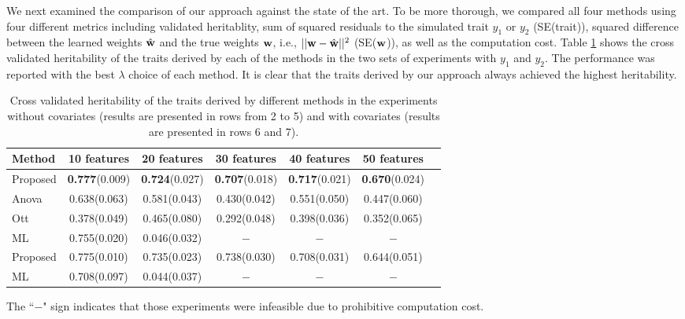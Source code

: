 \documentclass[10pt,letterpaper]{article}
\newcommand{\vect}[1]{\ensuremath\boldsymbol{\rm #1}}
\begin{document}
We next examined the comparison of our approach against the state of the art. To be more thorough, we compared all four methods using four different metrics including validated heritablity, sum of squared residuals to the simulated trait $y_1$ or $y_2$ (SE(trait)), squared difference between the learned weights $\hat{\vect w}$ and the true weights $\vect w$, i.e., $||\vect w - \hat{\vect w}||^2$ (SE($\vect w$)), as well as the computation cost. Table \ref{tbl:test-h2r-comp} shows the cross validated heritability of the traits derived by each of the methods in the two sets of experiments with $y_1$ and $y_2$. The performance was reported with the best $\lambda$ choice of each method. It is clear that the traits derived by our approach always achieved the highest heritability.
\begin{table}[h!]
	\caption{Cross validated heritability of the traits derived by different methods in the experiments without covariates (results are presented in rows from 2 to 5) and with covariates (results are presented in rows 6 and 7). }
	\label{tbl:test-h2r-comp}
	\vskip 0.15in
	\begin{center}
		\begin{small}
			\setlength{\tabcolsep}{4pt}
			\begin{tabular}{lcccccc}
				\hline
				Method	 &  10 features	 &  20 features   & 30 features	 & 40 features    & 50 features        \\
				\hline
				Proposed 	&	{\bf 0.777}(0.009)	&	{\bf 0.724}(0.027)	&	{\bf 0.707}(0.018)	&	{\bf 0.717}(0.021)	&	{\bf 0.670}(0.024)  \\
				Anova 	&	0.638(0.063)	&	0.581(0.043)	&	0.430(0.042)	&	0.551(0.050)	&	0.447(0.060)  \\
				Ott 	&	0.378(0.049)	&	0.465(0.080)	&	0.292(0.048)	&	0.398(0.036)	&	0.352(0.065)  \\
				ML 	&	0.755(0.020)	&	0.046(0.032)	&	$-$	&	$-$	&	$-$  \\
				\hline
				Proposed 	&	0.775(0.010)	&	0.735(0.023)	&	0.738(0.030)	&	0.708(0.031)	&	0.644(0.051) \\
				ML 	&	0.708(0.097)	&	0.044(0.037)	&	$-$	&	$-$	&	$-$  \\
				\hline
			\end{tabular}
		\end{small}
	\end{center}
	{\footnotesize The ``$-$" sign indicates that those experiments were infeasible due to prohibitive computation cost.} 
	\vskip -0.1in
\end{table}
\end{document}
